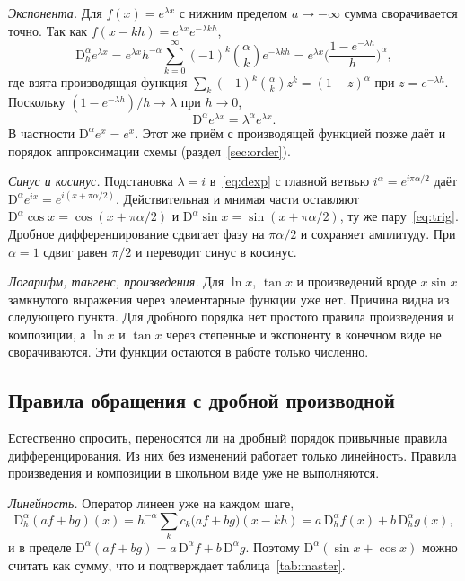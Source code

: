 \documentclass[14pt,a4paper]{extarticle}
\newcommand{\D}{\mathrm{D}}
\begin{document}
\textit{Экспонента.} Для $f(x)=e^{\lambda x}$ с нижним пределом $a\to-\infty$ сумма сворачивается точно. Так как $f(x-kh)=e^{\lambda x}e^{-\lambda kh}$,
\[
\D^{\alpha}_{h}e^{\lambda x}=e^{\lambda x}h^{-\alpha}\sum_{k=0}^{\infty}(-1)^k\binom{\alpha}{k}e^{-\lambda kh}=e^{\lambda x}\Big(\frac{1-e^{-\lambda h}}{h}\Big)^{\alpha},
\]
где взята производящая функция $\sum_k(-1)^k\binom{\alpha}{k}z^k=(1-z)^{\alpha}$ при $z=e^{-\lambda h}$. Поскольку $(1-e^{-\lambda h})/h\to\lambda$ при $h\to0$,
\begin{equation}
\D^{\alpha}e^{\lambda x}=\lambda^{\alpha}e^{\lambda x}.
\label{eq:dexp}
\end{equation}
В частности $\D^{\alpha}e^{x}=e^{x}$. Этот же приём с производящей функцией позже даёт и порядок аппроксимации схемы (раздел~\ref{sec:order}).

\textit{Синус и косинус.} Подстановка $\lambda=i$ в~\eqref{eq:dexp} с главной ветвью $i^{\alpha}=e^{i\pi\alpha/2}$ даёт $\D^{\alpha}e^{ix}=e^{i(x+\pi\alpha/2)}$. Действительная и мнимая части оставляют $\D^{\alpha}\cos x=\cos(x+\pi\alpha/2)$ и $\D^{\alpha}\sin x=\sin(x+\pi\alpha/2)$, ту же пару~\eqref{eq:trig}. Дробное дифференцирование сдвигает фазу на $\pi\alpha/2$ и сохраняет амплитуду. При $\alpha=1$ сдвиг равен $\pi/2$ и переводит синус в косинус.

\textit{Логарифм, тангенс, произведения.} Для $\ln x$, $\tan x$ и произведений вроде $x\sin x$ замкнутого выражения через элементарные функции уже нет. Причина видна из следующего пункта. Для дробного порядка нет простого правила произведения и композиции, а $\ln x$ и $\tan x$ через степенные и экспоненту в конечном виде не сворачиваются. Эти функции остаются в работе только численно.

\subsection{Правила обращения с дробной производной}
\label{sec:rules}

Естественно спросить, переносятся ли на дробный порядок привычные правила дифференцирования. Из них без изменений работает только линейность. Правила произведения и композиции в школьном виде уже не выполняются.

\textit{Линейность.} Оператор линеен уже на каждом шаге,
\[
\D^{\alpha}_{h}(af+bg)(x)=h^{-\alpha}\sum_{k}c_k\big(af+bg\big)(x-kh)=a\,\D^{\alpha}_{h}f(x)+b\,\D^{\alpha}_{h}g(x),
\]
и в пределе $\D^{\alpha}(af+bg)=a\,\D^{\alpha}f+b\,\D^{\alpha}g$. Поэтому $\D^{\alpha}(\sin x+\cos x)$ можно считать как сумму, что и подтверждает таблица~\ref{tab:master}.
\end{document}
